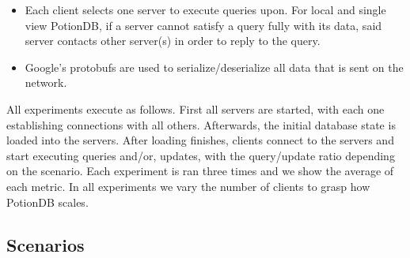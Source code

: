 \documentclass[sigconf, nonacm]{acmart}
\begin{document}
\begin{itemize}
	\item Each client selects one server to execute queries upon.
	For local and single view PotionDB, if a server cannot satisfy a query fully with its data, said server contacts other server(s) in order to reply to the query.
	\item Google's protobufs are used to serialize/deserialize all data that is sent on the network.
\end{itemize}

All experiments execute as follows.
First all servers are started, with each one establishing connections with all others. 
Afterwards, the initial database state is loaded into the servers.
After loading finishes, clients connect to the servers and start executing queries and/or, updates, with the query/update ratio depending on the scenario.
Each experiment is ran three times and we show the average of each metric.
In all experiments we vary the number of clients to grasp how PotionDB scales. %



\subsection{Scenarios}
\label{subsec.scenarios}
\end{document}
